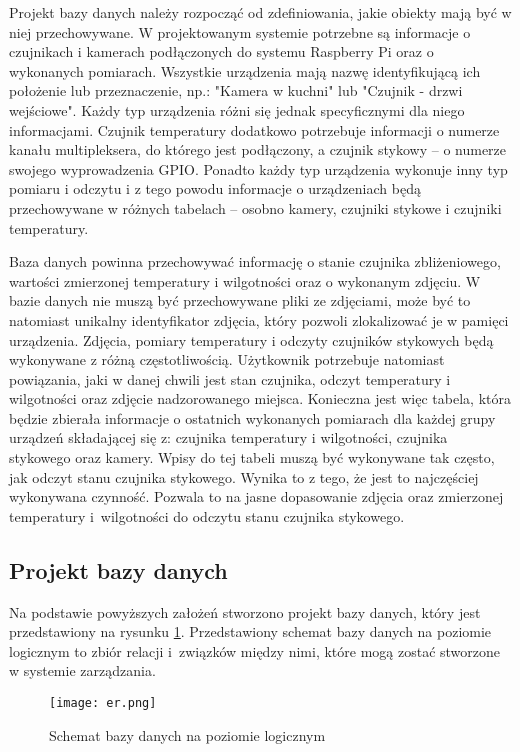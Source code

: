 \documentclass[a4paper,11pt,twoside]{article}
\begin{document}
Projekt bazy danych należy rozpocząć od zdefiniowania, jakie obiekty mają być w niej przechowywane. W projektowanym systemie potrzebne są informacje o czujnikach i kamerach podłączonych do systemu Raspberry Pi oraz o wykonanych pomiarach. Wszystkie urządzenia mają nazwę identyfikującą ich położenie lub przeznaczenie, np.: "Kamera w kuchni" lub "Czujnik - drzwi wejściowe". Każdy typ urządzenia różni się jednak specyficznymi dla niego informacjami. Czujnik temperatury dodatkowo potrzebuje informacji o numerze kanału multipleksera, do którego jest podłączony, a czujnik stykowy -- o numerze swojego wyprowadzenia GPIO. Ponadto każdy typ urządzenia wykonuje inny typ pomiaru i odczytu i z tego powodu informacje o urządzeniach będą przechowywane w różnych tabelach -- osobno kamery, czujniki stykowe i czujniki temperatury.

Baza danych powinna przechowywać informację o stanie czujnika zbliżeniowego, wartości zmierzonej temperatury i wilgotności oraz o wykonanym zdjęciu. W bazie danych nie muszą być przechowywane pliki ze zdjęciami, może być to natomiast unikalny identyfikator zdjęcia, który pozwoli zlokalizować je w pamięci urządzenia. Zdjęcia, pomiary temperatury i odczyty czujników stykowych będą wykonywane z różną częstotliwością. Użytkownik potrzebuje natomiast powiązania, jaki w danej chwili jest stan czujnika, odczyt temperatury i wilgotności oraz zdjęcie nadzorowanego miejsca. Konieczna jest więc tabela, która będzie zbierała informacje o ostatnich wykonanych pomiarach dla każdej grupy urządzeń składającej się z: czujnika temperatury i wilgotności, czujnika stykowego oraz kamery. Wpisy do tej tabeli muszą być wykonywane tak często, jak odczyt stanu czujnika stykowego. Wynika to z tego, że jest to najczęściej wykonywana czynność. Pozwala to na jasne dopasowanie zdjęcia oraz zmierzonej temperatury i~wilgotności do odczytu stanu czujnika stykowego.

\subsection{Projekt bazy danych}

Na podstawie powyższych założeń stworzono projekt bazy danych, który jest przedstawiony na rysunku \ref{fig: er}. Przedstawiony schemat bazy danych na poziomie logicznym to zbiór relacji i~związków między nimi, które mogą zostać stworzone w systemie zarządzania. 

\begin{figure}[h]
\texttt{[image: er.png]}
\caption{Schemat bazy danych na poziomie logicznym}
\label{fig: er}
\end{figure}
\end{document}
